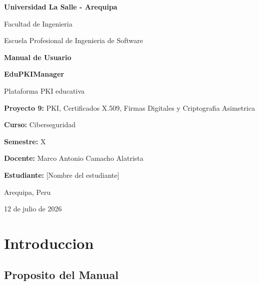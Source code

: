 \documentclass[12pt,a4paper]{article}
\begin{document}
\begin{titlepage}
    \centering
    \vspace*{1.7cm}
    {\Huge\bfseries Universidad La Salle - Arequipa\par}
    \vspace{1cm}
    {\Large Facultad de Ingenieria\par}
    \vspace{0.5cm}
    {\Large Escuela Profesional de Ingenieria de Software\par}

    \vspace{3.0cm}
    {\Huge\bfseries Manual de Usuario\par}
    \vspace{0.6cm}
    {\huge\bfseries EduPKIManager\par}
    \vspace{0.4cm}
    {\Large Plataforma PKI educativa\par}

    \vspace{1.2cm}
    {\Large\textbf{Proyecto 9:} PKI, Certificados X.509, Firmas Digitales y Criptografia Asimetrica\par}

    \vfill
    {\Large\textbf{Curso:} Ciberseguridad\par}
    \vspace{0.35cm}
    {\Large\textbf{Semestre:} X\par}
    \vspace{0.35cm}
    {\Large\textbf{Docente:} Marco Antonio Camacho Alatrista\par}
    \vspace{0.35cm}
    {\Large\textbf{Estudiante:} [Nombre del estudiante]\par}

    \vspace{1.1cm}
    {\Large Arequipa, Peru\par}
    {\Large 12 de julio de 2026\par}
\end{titlepage}

\tableofcontents
\newpage

\section{Introduccion}

\subsection{Proposito del Manual}
\end{document}
